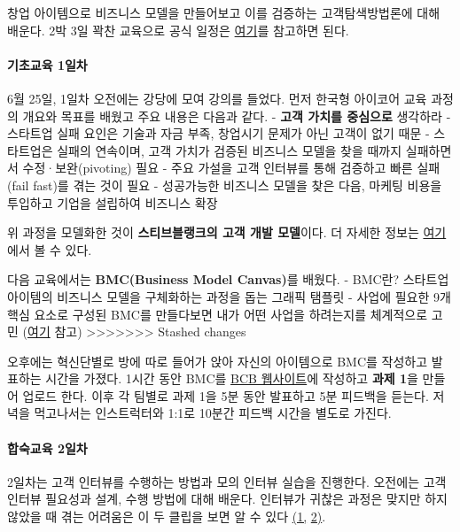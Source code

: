 \documentclass[
  letterpaper,
  DIV=11,
  numbers=noendperiod]{scrartcl}
\let\oldparagraph\paragraph
\renewcommand{\paragraph}[1]{\oldparagraph{#1}\mbox{}}
\begin{document}
창업 아이템으로 비즈니스 모델을 만들어보고 이를 검증하는
고객탐색방법론에 대해 배운다. 2박 3일 꽉찬 교육으로 공식 일정은
\href{../image/basicEducation_syllabus.png}{여기}를 참고하면 된다.

\hypertarget{uxae30uxcd08uxad50uxc721-1uxc77cuxcc28}{%
\paragraph{기초교육
1일차}\label{uxae30uxcd08uxad50uxc721-1uxc77cuxcc28}}

6월 25일, 1일차 오전에는 강당에 모여 강의를 들었다. 먼저 한국형 아이코어
교육 과정의 개요와 목표를 배웠고 주요 내용은 다음과 같다. - \textbf{고객
가치를 중심으로} 생각하라 - 스타트업 실패 요인은 기술과 자금 부족,
창업시기 문제가 아닌 고객이 없기 때문 - 스타트업은 실패의 연속이며, 고객
가치가 검증된 비즈니스 모델을 찾을 때까지 실패하면서 수정·보완(pivoting)
필요 - 주요 가설을 고객 인터뷰를 통해 검증하고 빠른 실패(fail fast)를
겪는 것이 필요 - 성공가능한 비즈니스 모델을 찾은 다음, 마케팅 비용을
투입하고 기업을 설립하여 비즈니스 확장

위 과정을 모델화한 것이 \textbf{스티브블랭크의 고객 개발 모델}이다. 더
자세한 정보는 \href{https://brunch.co.kr/@kbhpmp/31}{여기}에서 볼 수
있다.

다음 교육에서는 \textbf{BMC(Business Model Canvas)}를 배웠다. - BMC란?
스타트업 아이템의 비즈니스 모델을 구체화하는 과정을 돕는 그래픽 탬플릿 -
사업에 필요한 9개 핵심 요소로 구성된 BMC를 만들다보면 내가 어떤 사업을
하려는지를 체계적으로 고민
(\href{https://brunch.co.kr/@givemore/3}{여기} 참고)
\textgreater\textgreater\textgreater\textgreater\textgreater\textgreater\textgreater{}
Stashed changes

오후에는 혁신단별로 방에 따로 들어가 앉아 자신의 아이템으로 BMC를
작성하고 발표하는 시간을 가졌다. 1시간 동안 BMC를
\href{http://www.bcb.or.kr/}{BCB 웹사이트}에 작성하고 \textbf{과제 1}을
만들어 업로드 한다. 이후 각 팀별로 과제 1을 5분 동안 발표하고 5분
피드백을 듣는다. 저녁을 먹고나서는 인스트럭터와 1:1로 10분간 피드백
시간을 별도로 가진다.

\hypertarget{uxd569uxc219uxad50uxc721-2uxc77cuxcc28}{%
\paragraph{합숙교육
2일차}\label{uxd569uxc219uxad50uxc721-2uxc77cuxcc28}}

2일차는 고객 인터뷰를 수행하는 방법과 모의 인터뷰 실습을 진행한다.
오전에는 고객 인터뷰 필요성과 설계, 수행 방법에 대해 배운다. 인터뷰가
귀찮은 과정은 맞지만 하지 않았을 때 겪는 어려움은 이 두 클립을 보면 알
수 있다 \href{https://www.youtube.com/watch?v=uPhHPO98M84\&t=236s}{(1,}
\href{https://www.youtube.com/watch?v=mrR3CdaPCBY}{2)}.
\end{document}
